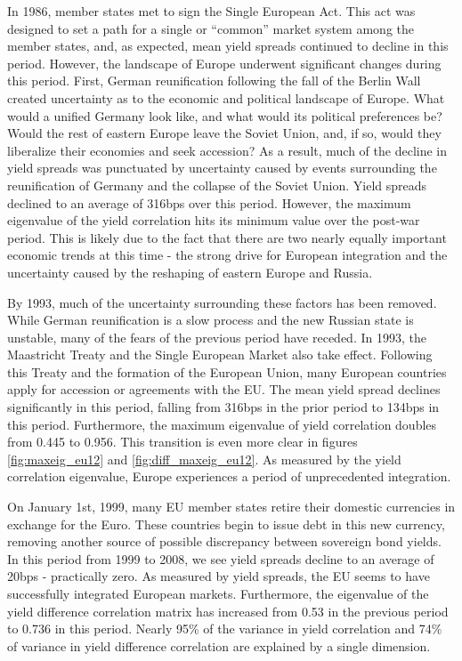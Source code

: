 \documentclass[3p]{elsarticle}
\begin{document}
In 1986, member states met to sign the Single European Act.  This act was designed to set a path for a single or ``common'' market system among the member states, and, as expected, mean yield spreads continued to decline in this period.  However, the landscape of Europe underwent significant changes during this period.  First, German reunification following the fall of the Berlin Wall created uncertainty as to the economic and political landscape of Europe.  What would a unified Germany look like, and what would its political preferences be?  Would the rest of eastern Europe leave the Soviet Union, and,  if so, would they liberalize their economies and seek accession?  As a result, much of the decline in yield spreads was punctuated by uncertainty caused by events surrounding the reunification of Germany and the collapse of the Soviet Union.  Yield spreads declined to an average of 316bps over this period.  However, the maximum eigenvalue of the yield correlation hits its minimum value over the post-war period.  This is likely due to the fact that there are two nearly equally important economic trends at this time - the strong drive for European integration and the uncertainty caused by the reshaping of eastern Europe and Russia.

By 1993, much of the uncertainty surrounding these factors has been removed.  While German reunification is a slow process and the new Russian state is unstable, many of the fears of the previous period have receded.  In 1993, the Maastricht Treaty and the Single European Market also take effect.  Following this Treaty and the formation of the European Union, many European countries apply for accession or agreements with the EU.  The mean yield spread declines significantly in this period, falling from 316bps in the prior period to 134bps in this period.  Furthermore, the maximum eigenvalue of yield correlation doubles from 0.445 to 0.956.  This transition is even more clear in figures \ref{fig:maxeig_eu12} and \ref{fig:diff_maxeig_eu12}.  As measured by the yield correlation eigenvalue, Europe experiences a period of unprecedented integration.

On January 1st, 1999, many EU member states retire their domestic currencies in exchange for the Euro.  These countries begin to issue debt in this new currency, removing another source of possible discrepancy between sovereign bond yields.  In this period from 1999 to 2008, we see yield spreads decline to an average of 20bps - practically zero.  As measured by yield spreads, the EU seems to have successfully integrated European markets.  Furthermore, the eigenvalue of the yield difference correlation matrix has increased from 0.53 in the previous period to 0.736 in this period.  Nearly 95\% of the variance in yield correlation and 74\% of variance in yield difference correlation are explained by a single dimension.  
\end{document}
